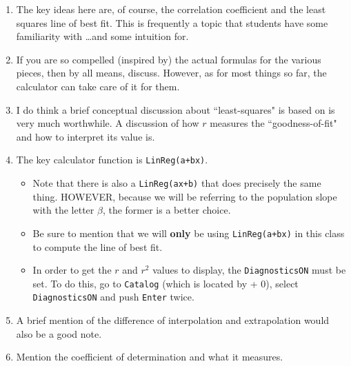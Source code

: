 \documentclass{article}
\begin{document}
\begin{enumerate}

  \item The key ideas here are, of course, the correlation coefficient and the least squares line of best fit. This is frequently a topic that students have some familiarity with \ldots and some intuition for.
  
  \item If you are so compelled (inspired by) the actual formulas for the various pieces, then by all means, discuss. However, as for most things so far, the calculator can take care of it for them.
  
  \item I do think a brief conceptual discussion about ``least-squares" is based on is very much worthwhile. A discussion of how $r$ measures the ``goodness-of-fit" and how to interpret its value is.
  
  \item The key calculator function is \texttt{LinReg(a+bx)}.
  
    \begin{itemize}
    
        \item Note that there is also a \texttt{LinReg(ax+b)} that does precisely the same thing. HOWEVER, because we will be referring to the population slope with the letter $\beta$, the former is a better choice.
        
        \item Be sure to mention that we will \textbf{only} be using \texttt{LinReg(a+bx)} in this class to compute the line of best fit.
        
        \item In order to get the $r$ and $r^2$ values to display, the \texttt{DiagnosticsON} must be set. To do this, go to \texttt{Catalog} (which is located by  + 0), select \texttt{DiagnosticsON} and push \texttt{Enter} twice.
        
    \end{itemize}
    
    \item A brief mention of the difference of interpolation and extrapolation would also be a good note.
    
    \item Mention the coefficient of determination and what it measures.
    
\end{enumerate}
\end{document}
